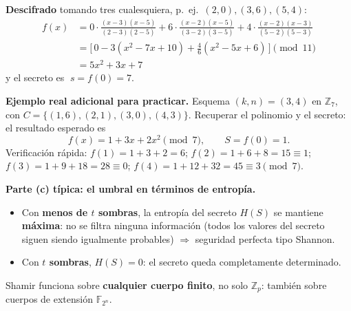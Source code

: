 \documentclass[../main.tex]{subfiles}
\begin{document}
\textbf{Descifrado} tomando tres cualesquiera, p.\ ej.\ $(2,0),(3,6),(5,4)$:
\begin{align*}
f(x) &= 0 \cdot \frac{(x-3)(x-5)}{(2-3)(2-5)} + 6 \cdot \frac{(x-2)(x-5)}{(3-2)(3-5)} + 4 \cdot \frac{(x-2)(x-3)}{(5-2)(5-3)}\\
&= \Big[\, 0 - 3(x^2 - 7x + 10) + \tfrac{4}{6}(x^2 - 5x + 6)\,\Big] \pmod{11}\\
&= 5x^2 + 3x + 7
\end{align*}
y el secreto es $\;s = f(0) = 7.\;$ \checkmark

\begin{examen}
\textbf{Ejemplo real adicional para practicar.} Esquema $(k,n)=(3,4)$ en
$\mathbb{Z}_7$, con $C=\{(1,6),(2,1),(3,0),(4,3)\}$. Recuperar el polinomio y el
secreto: el resultado esperado es
\[
f(x) = 1 + 3x + 2x^2 \pmod 7, \qquad S = f(0) = 1.
\]
Verificación rápida: $f(1)=1+3+2=6$; $f(2)=1+6+8=15\equiv 1$; $f(3)=1+9+18=28\equiv 0$;
$f(4)=1+12+32=45\equiv 3 \pmod 7$. \checkmark
\end{examen}

\begin{examen}
\textbf{Parte (c) típica: el umbral en términos de entropía.}
\begin{itemize}[leftmargin=1.3em]
  \item Con \textbf{menos de $t$ sombras}, la entropía del secreto $H(S)$ se mantiene
  \textbf{máxima}: no se filtra ninguna información (todos los valores del secreto
  siguen siendo igualmente probables) $\Rightarrow$ seguridad perfecta tipo Shannon.
  \item Con \textbf{$t$ sombras}, $H(S) = 0$: el secreto queda completamente
  determinado.
\end{itemize}
\end{examen}

\begin{destacado}
Shamir funciona sobre \textbf{cualquier cuerpo finito}, no solo $\mathbb{Z}_p$:
también sobre cuerpos de extensión $\mathbb{F}_{2^n}$.
\end{destacado}
\end{document}

